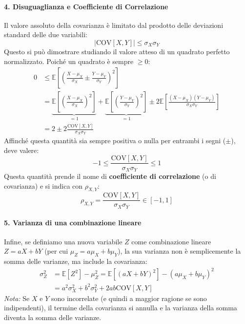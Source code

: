 \paragraph{4. Disuguaglianza e Coefficiente di Correlazione}
Il valore assoluto della covarianza è limitato dal prodotto delle deviazioni standard delle due variabili:
\begin{equation}
    |\text{COV}[X, Y]| \leq \sigma_X \sigma_Y
\end{equation}
Questo si può dimostrare studiando il valore atteso di un quadrato perfetto normalizzato. Poiché un quadrato è sempre $\geq 0$:
\begin{align*}
    0 &\leq \mathbb{E}\left[ \left( \frac{X - \mu_X}{\sigma_X} \pm \frac{Y - \mu_Y}{\sigma_Y} \right)^2 \right] \\
    &= \underbrace{\mathbb{E}\left[ \left( \frac{X - \mu_X}{\sigma_X} \right)^2 \right]}_{=1} + \underbrace{\mathbb{E}\left[ \left( \frac{Y - \mu_Y}{\sigma_Y} \right)^2 \right]}_{=1} \pm 2\mathbb{E}\left[ \frac{(X - \mu_X)(Y - \mu_Y)}{\sigma_X \sigma_Y} \right] \\
    &= 2 \pm 2 \frac{\text{COV}[X, Y]}{\sigma_X \sigma_Y}
\end{align*}
Affinché questa quantità sia sempre positiva o nulla per entrambi i segni ($\pm$), deve valere:
\[
-1 \leq \frac{\text{COV}[X, Y]}{\sigma_X \sigma_Y} \leq 1
\]
Questa quantità prende il nome di \textbf{coefficiente di correlazione} (o di covarianza) e si indica con $\rho_{X,Y}$:
\begin{equation}
    \rho_{X,Y} = \frac{\text{COV}[X, Y]}{\sigma_X \sigma_Y} \in [-1, 1]
\end{equation}

\paragraph{5. Varianza di una combinazione lineare}
Infine, se definiamo una nuova variabile $Z$ come combinazione lineare $Z = aX + bY$ (per cui $\mu_Z = a\mu_X + b\mu_Y$), la sua varianza non è semplicemente la somma delle varianze, ma include la covarianza:
\begin{align*}
    \sigma_Z^2 &= \mathbb{E}[Z^2] - \mu_Z^2 = \mathbb{E}[(aX + bY)^2] - (a\mu_X + b\mu_Y)^2 \\
    &= a^2\sigma_X^2 + b^2\sigma_Y^2 + 2ab\text{COV}[X, Y]
\end{align*}
\textit{Nota:} Se $X$ e $Y$ sono incorrelate (e quindi a maggior ragione se sono indipendenti), il termine della covarianza si annulla e la varianza della somma diventa la somma delle varianze.